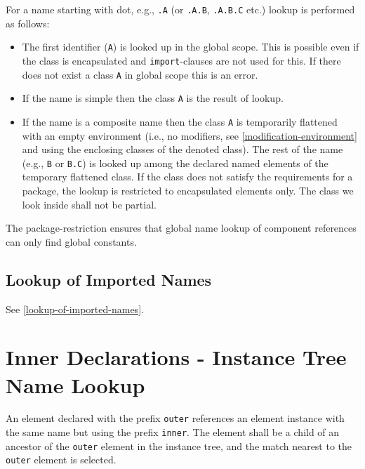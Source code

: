 For a name starting with dot, e.g., \lstinline!.A! (or \lstinline!.A.B!, \lstinline!.A.B.C! etc.) lookup is performed as follows:
\begin{itemize}
\item
  The first identifier (\lstinline!A!) is looked up in the global scope.
  This is possible even if the class is encapsulated and \lstinline!import!-clauses are not used for this.
  If there does not exist a class \lstinline!A! in global scope this is an error.
\item
  If the name is simple then the class \lstinline!A! is the result of lookup.
\item
  If the name is a composite name then the class \lstinline!A! is temporarily flattened with an empty environment (i.e., no modifiers, see \cref{modification-environment} and using the enclosing classes of the denoted class).
  The rest of the name (e.g., \lstinline!B! or \lstinline!B.C!) is looked up among the declared named elements of the temporary flattened class.
  If the class does not satisfy the requirements for a package, the lookup is restricted to encapsulated elements only.
  The class we look inside shall not be partial.
\end{itemize}

\begin{nonnormative}
The package-restriction ensures that global name lookup of component references can only find global constants.
\end{nonnormative}


\subsection{Lookup of Imported Names}\label{lookup-of-imported-names1}

See \cref{lookup-of-imported-names}.


\section{Inner Declarations - Instance Tree Name Lookup}\label{instance-hierarchy-name-lookup-of-inner-declarations}\label{inner-declarations-instance-tree-name-lookup}

An element declared with the prefix \lstinline!outer! references an element instance with the same name but using the prefix \lstinline!inner!.
The  element shall be a child of an ancestor of the \lstinline!outer! element in the instance tree, and the match nearest to the \lstinline!outer! element is selected.

